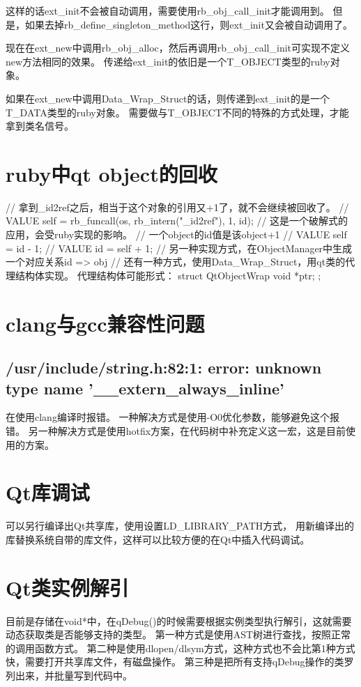 这样的话ext\_init不会被自动调用，需要使用rb\_obj\_call\_init才能调用到。
但是，如果去掉rb\_define\_singleton\_method这行，则ext\_init又会被自动调用了。

现在在ext\_new中调用rb\_obj\_alloc，然后再调用rb\_obj\_call\_init可实现不定义new方法相同的效果。
传递给ext\_init的依旧是一个T\_OBJECT类型的ruby对象。

如果在ext\_new中调用Data\_Wrap\_Struct的话，则传递到ext\_init的是一个T\_DATA类型的ruby对象。
需要做与T\_OBJECT不同的特殊的方式处理，才能拿到类名信号。

\section{ruby中qt object的回收}
// 拿到_id2ref之后，相当于这个对象的引用又+1了，就不会继续被回收了。
// VALUE self = rb_funcall(os, rb_intern("_id2ref"), 1, id);
// 这是一个破解式的应用，会受ruby实现的影响。
// 一个object的id值是该object+1
// VALUE self = id - 1;
// VALUE id = self + 1;
// 另一种实现方式，在ObjectManager中生成一个对应关系id => obj
// 还有一种方式，使用Data\_Wrap\_Struct，用qt类的代理结构体实现。
代理结构体可能形式：
struct QtObjectWrap {
    void *ptr;
};

\section{clang与gcc兼容性问题}
\subsection{/usr/include/string.h:82:1: error: unknown type name '\_\_extern\_always\_inline'}
在使用clang编译时报错。
一种解决方式是使用-O0优化参数，能够避免这个报错。
另一种解决方式是使用hotfix方案，在代码树中补充定义这一宏，这是目前使用的方案。

\section{Qt库调试}
可以另行编译出Qt共享库，使用设置LD\_LIBRARY\_PATH方式，
用新编译出的库替换系统自带的库文件，这样可以比较方便的在Qt中插入代码调试。

\section{Qt类实例解引}
目前是存储在void*中，在qDebug()的时候需要根据实例类型执行解引，这就需要动态获取类是否能够支持的类型。
第一种方式是使用AST树进行查找，按照正常的调用函数方式。
第二种是使用dlopen/dlsym方式，这种方式也不会比第1种方式快，需要打开共享库文件，有磁盘操作。
第三种是把所有支持qDebug操作的类罗列出来，并批量写到代码中。

